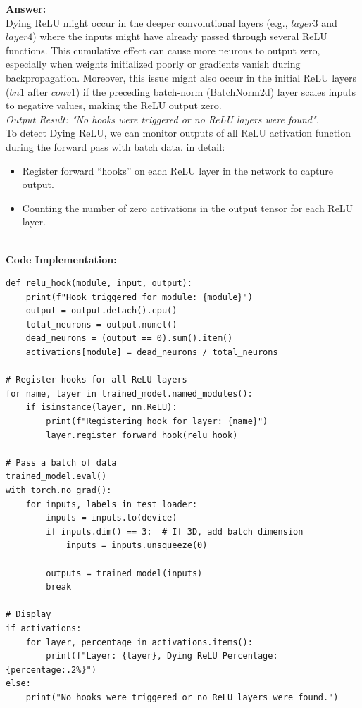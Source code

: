 \documentclass[11pt, oneside]{article}   	%
\begin{document}
\textbf{Answer:} \\
Dying ReLU might occur in the deeper convolutional layers (e.g., $layer3$ and $layer4$) where the inputs might have already passed through several ReLU functions. This cumulative effect can cause more neurons to output zero, especially when weights initialized poorly or gradients vanish during backpropagation. Moreover, this issue might also occur in the initial ReLU layers ($bn1$ after $conv1$) if the preceding batch-norm (BatchNorm2d) layer scales inputs to negative values, making the ReLU output zero.
\\
\textit{Output Result: "No hooks were triggered or no ReLU layers were found".}
\\
To detect Dying ReLU, we can monitor outputs of all ReLU activation function during the forward pass with batch data. in detail:
\begin{itemize}
    \item Register forward ``hooks'' on each ReLU layer in the network to capture output.
    \item Counting the number of zero activations in the output tensor for each ReLU layer.
\end{itemize}
\\
\textbf{Code Implementation: }
\begin{verbatim}
def relu_hook(module, input, output):
    print(f"Hook triggered for module: {module}")
    output = output.detach().cpu()
    total_neurons = output.numel()
    dead_neurons = (output == 0).sum().item()
    activations[module] = dead_neurons / total_neurons

# Register hooks for all ReLU layers
for name, layer in trained_model.named_modules():
    if isinstance(layer, nn.ReLU):
        print(f"Registering hook for layer: {name}")
        layer.register_forward_hook(relu_hook)

# Pass a batch of data
trained_model.eval()
with torch.no_grad():
    for inputs, labels in test_loader:
        inputs = inputs.to(device)
        if inputs.dim() == 3:  # If 3D, add batch dimension
            inputs = inputs.unsqueeze(0)

        outputs = trained_model(inputs)
        break

# Display
if activations:
    for layer, percentage in activations.items():
        print(f"Layer: {layer}, Dying ReLU Percentage: {percentage:.2%}")
else:
    print("No hooks were triggered or no ReLU layers were found.")
\end{verbatim}
\end{document}
